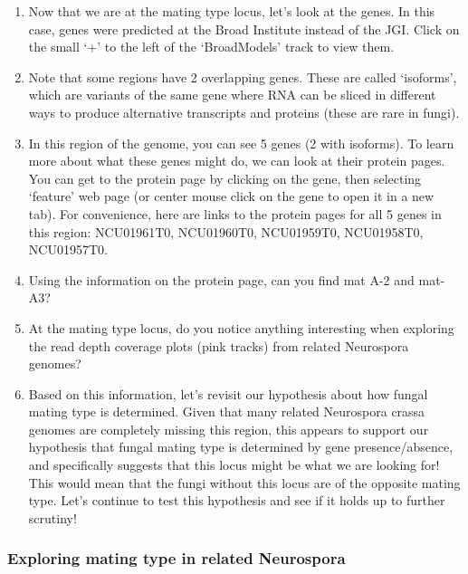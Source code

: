 \documentclass[
  letterpaper,
  DIV=11,
  numbers=noendperiod]{scrreprt}
\begin{document}
\begin{enumerate}
  Supercontig\_1:1853928-1868957. Remember, if you are lost, every
  MycoCosm page has a HELP! tab you can access from the menu bar.
\item
  Now that we are at the mating type locus, let's look at the genes. In
  this case, genes were predicted at the Broad Institute instead of the
  JGI. Click on the small `+' to the left of the `BroadModels' track to
  view them.
\item
  Note that some regions have 2 overlapping genes. These are called
  `isoforms', which are variants of the same gene where RNA can be
  sliced in different ways to produce alternative transcripts and
  proteins (these are rare in fungi).
\item
  In this region of the genome, you can see 5 genes (2 with isoforms).
  To learn more about what these genes might do, we can look at their
  protein pages. You can get to the protein page by clicking on the
  gene, then selecting `feature' web page (or center mouse click on the
  gene to open it in a new tab). For convenience, here are links to the
  protein pages for all 5 genes in this region: NCU01961T0, NCU01960T0,
  NCU01959T0, NCU01958T0, NCU01957T0.
\item
  Using the information on the protein page, can you find mat A-2 and
  mat-A3?
\item
  At the mating type locus, do you notice anything interesting when
  exploring the read depth coverage plots (pink tracks) from related
  Neurospora genomes?
\item
  Based on this information, let's revisit our hypothesis about how
  fungal mating type is determined. Given that many related Neurospora
  crassa genomes are completely missing this region, this appears to
  support our hypothesis that fungal mating type is determined by gene
  presence/absence, and specifically suggests that this locus might be
  what we are looking for! This would mean that the fungi without this
  locus are of the opposite mating type. Let's continue to test this
  hypothesis and see if it holds up to further scrutiny!
\end{enumerate}

\subsubsection*{Exploring mating type in related
Neurospora}\label{exploring-mating-type-in-related-neurospora}
\end{document}
